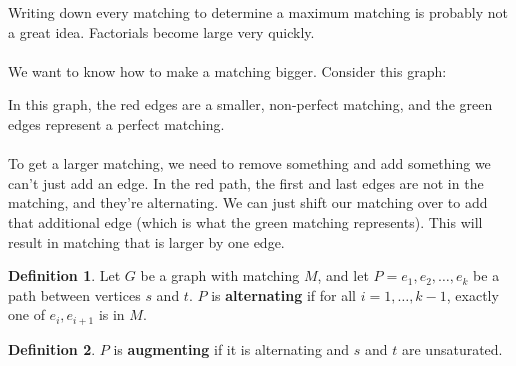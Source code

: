 \documentclass[]{article}
\theoremstyle{definition}
\newtheorem*{defn}{Definition}
\begin{document}
				Writing down every matching to determine a maximum matching is probably not a great idea. Factorials become large very quickly.
				\\ \\
				We want to know how to make a matching bigger. Consider this graph:
				\begin{center}
				\end{center}
				
				In this graph, the red edges are a smaller, non-perfect matching, and the green edges represent a perfect matching.
				\\ \\
				To get a larger matching, we need to remove something and add something \textendash{} we can't just add an edge. In the red path, the first and last edges are not in the matching, and they're alternating. We can just shift our matching over to add that additional edge (which is what the green matching represents). This will result in matching that is larger by one edge.
				
				\begin{defn}
					Let $G$ be a graph with matching $M$, and let $P = e_1, e_2, \ldots, e_k$ be a path between vertices $s$ and $t$. $P$ is \textbf{alternating} if for all $i = 1, \ldots, k - 1$, exactly one of $e_i, e_{i + 1}$ is in $M$.
				\end{defn}
				
				\begin{defn}
					$P$ is \textbf{augmenting} if it is alternating and $s$ and $t$ are unsaturated.
				\end{defn}
				
\end{document}
